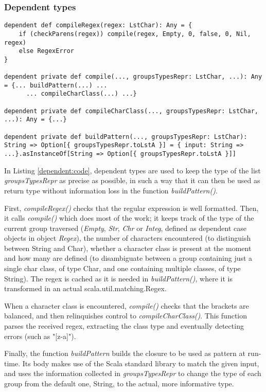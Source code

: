 \subsubsection{Dependent types}

\begin{lstlisting}[style=myScalastyle, caption={Dependent types prototypes.}, captionpos=b, label={dependent:code}]
dependent def compileRegex(regex: LstChar): Any = {
    if (checkParens(regex)) compile(regex, Empty, 0, false, 0, Nil, regex)
    else RegexError
}

dependent private def compile(..., groupsTypesRepr: LstChar, ...): Any = {... buildPattern(...) ... 
      ... compileCharClass(...) ...}

dependent private def compileCharClass(..., groupsTypesRepr: LstChar, ...): Any = {...}

dependent private def buildPattern(..., groupsTypesRepr: LstChar): String => Option[{ groupsTypesRepr.toLstA }] = { input: String => ...}.asInstanceOf[String => Option[{ groupsTypesRepr.toLstA }]]
\end{lstlisting}

In Listing \ref{dependent:code}, dependent types are used to keep the type of the list \textit{groupsTypesRepr} as precise as possible, in such a way that it can then be used as return type without information loss in the function \textit{buildPattern()}.

First, \textit{compileRegex()} checks that the regular expression is well formatted. Then, it calls \textit{compile()} which does most of the work; it keeps track of the type of the current group traversed (\textit{Empty}, \textit{Str}, \textit{Chr} or \textit{Integ}, defined as dependent case objects in object \textit{Regex}), the number of characters encountered (to distinguish between String and Char), whether a character class is present at the moment and how many are defined (to disambiguate between a group containing just a single char class, of type Char, and one containing multiple classes, of type String). The regex is cached as it is needed in \textit{buildPattern()}, where it is transformed in an actual scala.util.matching.Regex.

When a character class is encountered, \textit{compile()} checks that the brackets are balanced, and then relinquishes control to \textit{compileCharClass()}. This function parses the received regex, extracting the class type and eventually detecting errors (such as "[z-a]").

Finally, the function \textit{buildPattern} builds the closure to be used as pattern at run-time. Its body makes use of the Scala standard library to match the given input, and uses the information collected in \textit{groupsTypesRepr} to change the type of each group from the default one, String, to the actual, more informative type. 

